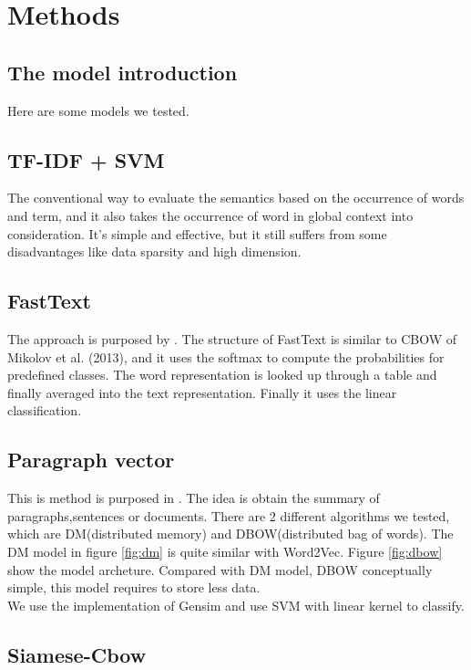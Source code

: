 \chapter{Methods}

\section{The model introduction}

Here are some models we tested.

\section{TF-IDF + SVM}

	The conventional way to evaluate the semantics based on the occurrence of words and term, and it also takes the occurrence of word in global context into consideration.  It's simple and effective, but it still suffers from some disadvantages like data sparsity and high dimension. \\
	
\section{FastText}
	
	The approach is purposed by \cite{joulin2016fasttext}. The structure of FastText is similar to CBOW of Mikolov et al. (2013), and it uses the softmax to compute the probabilities for predefined classes. The word representation is looked up through a table and finally averaged into the text representation. Finally it uses the linear classification.

\section{Paragraph vector}
	
This is method is purposed in \cite{PVDB}. The idea is obtain the summary of paragraphs,sentences or documents. 
There are 2 different algorithms we tested, which are DM(distributed memory) and DBOW(distributed bag of words). 
The DM model in figure \ref{fig:dm} is quite similar with Word2Vec.
Figure \ref{fig:dbow} show the model archeture. Compared with DM model, DBOW conceptually simple, this model requires to store less data. \\

We use the implementation of Gensim and use SVM with linear kernel to classify.

\section{Siamese-Cbow}

